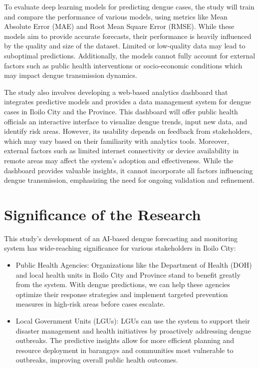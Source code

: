To evaluate deep learning models for predicting dengue cases, the study will train and compare the performance of various models, using metrics like Mean Absolute Error (MAE) and Root Mean Square Error (RMSE). While these models aim to provide accurate forecasts, their performance is heavily influenced by the quality and size of the dataset. Limited or low-quality data may lead to suboptimal predictions. Additionally, the models cannot fully account for external factors such as public health interventions or socio-economic conditions which may impact dengue transmission dynamics.

The study also involves developing a web-based analytics dashboard that integrates predictive models and provides a data management system for dengue cases in Iloilo City and the Province. This dashboard will offer public health officials an interactive interface to visualize dengue trends, input new data, and identify risk areas. However, its usability depends on feedback from stakeholders, which may vary based on their familiarity with analytics tools. Moreover, external factors such as limited internet connectivity or device availability in remote areas may affect the system's adoption and effectiveness. While the dashboard provides valuable insights, it cannot incorporate all factors influencing dengue transmission, emphasizing the need for ongoing validation and refinement.



\section{Significance of the Research}
\label{sec:significance}

This study’s development of an AI-based dengue forecasting and monitoring system has wide-reaching significance for various stakeholders in Iloilo City:

\begin{itemize}
	\item  Public Health Agencies: Organizations like the Department of Health (DOH) and local health units in Iloilo City and Province stand to benefit greatly from the system. With dengue predictions, we can help these agencies optimize their response strategies and implement targeted prevention measures in high-risk areas before cases escalate.
\end{itemize}

\begin{itemize} 
	\item Local Government Units (LGUs): LGUs can use the system to support their disaster management and health initiatives by proactively addressing dengue outbreaks. The predictive insights allow for more efficient planning and resource deployment in barangays and communities most vulnerable to outbreaks, improving overall public health outcomes.
\end{itemize}


